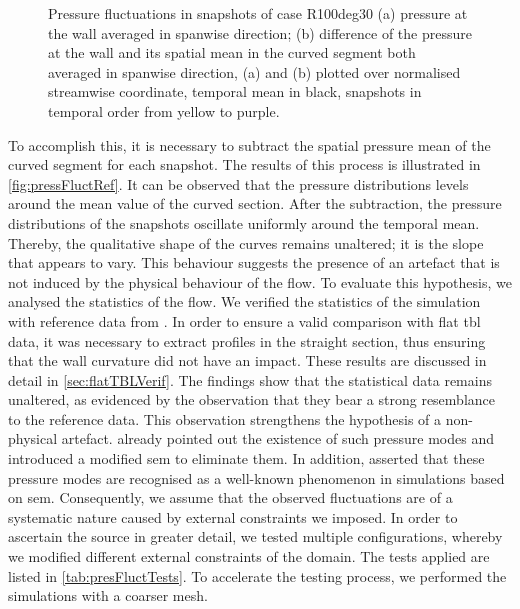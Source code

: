 \begin{figure}[h!]
\centering

\caption[Pressure fluctuations in snapshots of case R100deg30 (a) pressure at the wall averaged in spanwise direction; (b) difference of the pressure at the wall and its spatial mean in the curved segment both averaged in spanwise direction]{Pressure fluctuations in snapshots of case R100deg30 (a) pressure at the wall averaged in spanwise direction; (b) difference of the pressure at the wall and its spatial mean in the curved segment both averaged in spanwise direction, (a) and (b) plotted over normalised streamwise coordinate, temporal mean in black, snapshots in temporal order from yellow to purple.}
\label{fig:pressFluctRef}
\end{figure}


To accomplish this, it is necessary to subtract the spatial pressure mean of the curved segment for each snapshot. 
The results of this process is illustrated in \autoref{fig:pressFluctRef}.
It can be observed that the pressure distributions levels around the mean value of the curved section.
After the subtraction, the pressure distributions of the snapshots oscillate uniformly around the temporal mean.
Thereby, the qualitative shape of the curves remains unaltered; it is the slope that appears to vary.
This behaviour suggests the presence of an artefact that is not induced by the physical behaviour of the flow. 
To evaluate this hypothesis, we analysed the statistics of the flow.
We verified the statistics of the simulation with reference data from \citet{schlatter_assessment_2010}.
In order to ensure a valid comparison with flat \acrshort{tbl} data, it was necessary to extract profiles in the straight section, thus ensuring that the wall curvature did not have an impact.
These results are discussed in detail in \autoref{sec:flatTBLVerif}.
The findings show that the statistical data remains unaltered, as evidenced by the observation that they bear a strong resemblance to the reference data.
This observation strengthens the hypothesis of a non-physical artefact.
\citet{maday_spectral_1989} already pointed out the existence of such pressure modes and introduced a modified \acrshort{sem} to eliminate them.
In addition, \citet{sabbah_filtering_2001} asserted that these pressure modes are recognised as a well-known phenomenon in simulations based on \acrshort{sem}.
Consequently, we assume that the observed fluctuations are of a systematic nature caused by external constraints we imposed.
In order to ascertain the source in greater detail, we tested multiple configurations, whereby we modified different external constraints of the domain.
The  tests applied  are listed in \autoref{tab:presFluctTests}.
To accelerate the testing process, we performed the simulations with a coarser mesh.

